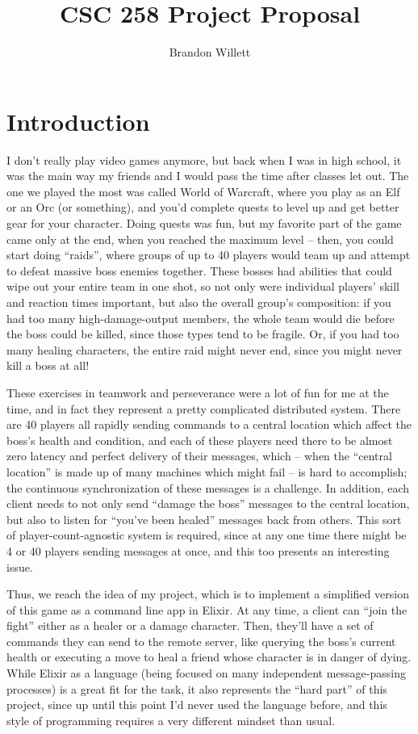 \documentclass[letterpaper]{article}
\title{CSC 258 Project Proposal}
\author{Brandon Willett}
\begin{document}
	\maketitle

	\section{Introduction}

	I don't really play video games anymore, but back when I was in high school, it was the main way my friends and I would pass the time after classes let out. The one we played the most was called World of Warcraft, where you play as an Elf or an Orc (or something), and you'd complete quests to level up and get better gear for your character. Doing quests was fun, but my favorite part of the game came only at the end, when you reached the maximum level -- then, you could start doing ``raids'', where groups of up to 40 players would team up and attempt to defeat massive boss enemies together. These bosses had abilities that could wipe out your entire team in one shot, so not only were individual players' skill and reaction times important, but also the overall group's composition: if you had too many high-damage-output members, the whole team would die before the boss could be killed, since those types tend to be fragile. Or, if you had too many healing characters, the entire raid might never end, since you might never kill a boss at all!

	These exercises in teamwork and perseverance were a lot of fun for me at the time, and in fact they represent a pretty complicated distributed system. There are 40 players all rapidly sending commands to a central location which affect the boss's health and condition, and each of these players need there to be almost zero latency and perfect delivery of their messages, which -- when the ``central location'' is made up of many machines which might fail -- is hard to accomplish; the continuous synchronization of these messages is a challenge. In addition, each client needs to not only send ``damage the boss'' messages to the central location, but also to listen for ``you've been healed'' messages back from others. This sort of player-count-agnostic system is required, since at any one time there might be 4 or 40 players sending messages at once, and this too presents an interesting issue.

	Thus, we reach the idea of my project, which is to implement a simplified version of this game as a command line app in Elixir. At any time, a client can ``join the fight'' either as a healer or a damage character. Then, they'll have a set of commands they can send to the remote server, like querying the boss's current health or executing a move to heal a friend whose character is in danger of dying. While Elixir as a language (being focused on many independent message-passing processes) is a great fit for the task, it also represents the ``hard part'' of this project, since up until this point I'd never used the language before, and this style of programming requires a very different mindset than usual.
\end{document}

